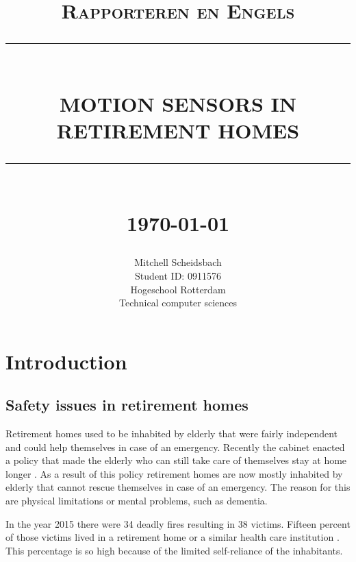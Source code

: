 \documentclass[12pt]{report}
\newcommand{\HRule}[1]{\rule{\linewidth}{#1}}
\begin{document}
\title{ \normalsize \textsc{Rapporteren en Engels}
		\\ [2.0cm]
		\HRule{0.5pt} \\
		\LARGE \textbf{\uppercase{Motion sensors in retirement homes}}
		\HRule{2pt} \\ [0.5cm]
		\normalsize \today \vspace*{5\baselineskip}}

\date{}

\author{
		Mitchell Scheidsbach \\
		Student ID: 0911576 \\ 
		Hogeschool Rotterdam \\
		Technical computer sciences }

\maketitle
\tableofcontents
\newpage

\sectionfont{\scshape}

\chapter{Introduction}
\section{Safety issues in retirement homes}
Retirement homes used to be inhabited by elderly that were fairly independent and could help themselves in case of an emergency. Recently the cabinet enacted a policy that made the elderly who can still take care of themselves stay at home longer \cite{Zorgwijzer2017}. As a result of this policy retirement homes are now mostly inhabited by elderly that cannot rescue themselves in case of an emergency. The reason for this are physical limitations or mental problems, such as dementia.

In the year 2015 there were 34 deadly fires resulting in 38 victims. Fifteen percent of those victims lived in a retirement home or a similar health care institution \cite{Kobes2016}. This percentage is so high because of the limited self-reliance of the inhabitants.
\end{document}
